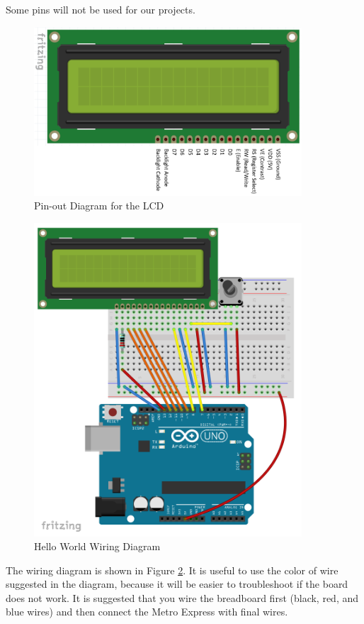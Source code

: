 \documentclass[]{article}
\begin{document}
Some pins will not be used for our projects.

\begin{figure}
	\centering
	\includegraphics[width=10cm]{pics/lcd pinout.png}
	\caption{Pin-out Diagram for the LCD}
	\label{fig2}
\end{figure}

\begin{figure}
	\centering
	\includegraphics[width=10cm]{pics/lcd wiring.png}
	\caption{Hello World Wiring Diagram}
	\label{HelloWorld}
\end{figure}

The wiring diagram is shown in Figure \ref{HelloWorld}.  It is useful to use the color of wire suggested in the diagram, because it will be  easier to troubleshoot if the board does not work.  It is suggested that you wire the breadboard first (black, red, and blue wires) and then connect the Metro Express with final wires.  
\end{document}
